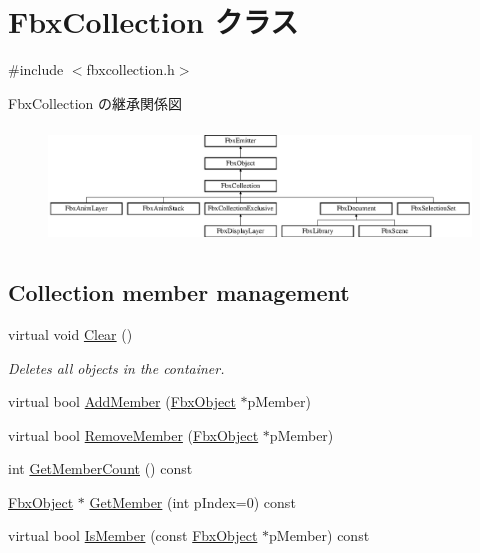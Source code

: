 \hypertarget{class_fbx_collection}{}\section{Fbx\+Collection クラス}
\label{class_fbx_collection}


{\ttfamily \#include $<$fbxcollection.\+h$>$}

Fbx\+Collection の継承関係図\begin{figure}[H]
\begin{center}
\leavevmode
\includegraphics[height=3.090508cm]{class_fbx_collection}
\end{center}
\end{figure}
\subsection*{Collection member management}
\begin{DoxyCompactItemize}
\item 
virtual void \hyperlink{class_fbx_collection_a79ba35ab4693cd1b1c79a221d7d2f8d3}{Clear} ()
\begin{DoxyCompactList}\small\item\em Deletes all objects in the container. \end{DoxyCompactList}\item 
virtual bool \hyperlink{class_fbx_collection_a8f9bfa57454dda20ef75dd4f27761a15}{Add\+Member} (\hyperlink{class_fbx_object}{Fbx\+Object} $\ast$p\+Member)
\item 
virtual bool \hyperlink{class_fbx_collection_a8a65c60bae5ebfcd19f4aaad99ec10f1}{Remove\+Member} (\hyperlink{class_fbx_object}{Fbx\+Object} $\ast$p\+Member)
\item 
int \hyperlink{class_fbx_collection_a3e22b8afd7b46dcc4988c2723dd75e02}{Get\+Member\+Count} () const
\item 
\hyperlink{class_fbx_object}{Fbx\+Object} $\ast$ \hyperlink{class_fbx_collection_a79c52e9fdd2c04a29b5ba04ff7e15bc6}{Get\+Member} (int p\+Index=0) const
\item 
virtual bool \hyperlink{class_fbx_collection_a988fd0dcbe61e4b9b165d6830543f49e}{Is\+Member} (const \hyperlink{class_fbx_object}{Fbx\+Object} $\ast$p\+Member) const
\end{DoxyCompactItemize}
